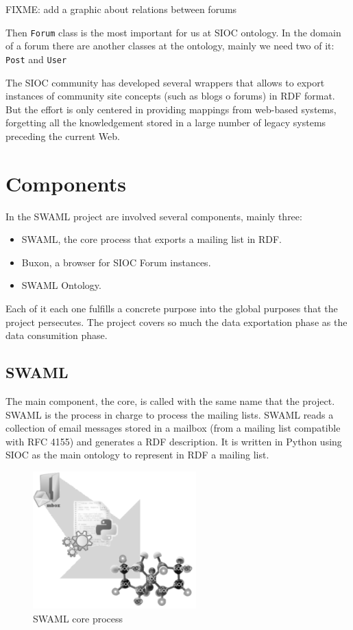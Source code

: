\documentclass{llncs}
\begin{document}
FIXME: add a graphic about relations between forums

Then \texttt{Forum} class is the most important for us at SIOC ontology. In the 
domain of a forum there are another classes at the ontology, mainly we need two
of it: \texttt{Post} and \texttt{User} 

The SIOC community has developed several wrappers that allows to export instances
of community site concepts (such as blogs o forums) in RDF format. But the effort 
is only centered in providing mappings from web-based systems, forgetting all the 
knowledgement stored in a large number of legacy systems preceding the current Web.

\section{\label{sec:software}Components}

In the SWAML project are involved several components, mainly three:

\begin{itemize}
 \item SWAML, the core process that exports a mailing list in RDF.
 \item Buxon, a browser for SIOC Forum instances.
 \item SWAML Ontology.
\end{itemize}

Each of it each one fulfills a concrete purpose into the global purposes that 
the project persecutes. The project covers so much the data exportation phase 
as the data consumition phase.

\subsection{SWAML}

The main component, the core, is called with the same name that the project. SWAML is
the process in charge to process the mailing lists. SWAML reads a collection of email 
messages stored in a mailbox (from a mailing list compatible with RFC 4155) and generates 
a RDF description. It is written in Python using SIOC as the main ontology to represent 
in RDF a mailing list.

\begin{figure}[ht]
 \centering
 \includegraphics[bb=0 0 238 200]{images/swaml-process.png}
 \caption{SWAML core process}
\end{figure}
\end{document}
